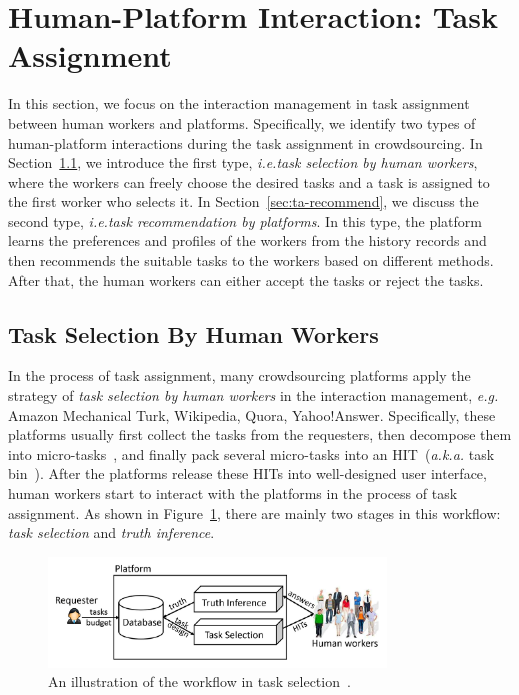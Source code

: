 \documentclass[11pt]{article}
\newcommand{\eg}{\textit{e.g.}\xspace}
\newcommand{\ie}{\textit{i.e.}\xspace}
\newcommand{\aka}{\textit{a.k.a.}\xspace}
\newcommand\figref[1]{Figure~\ref{#1}}
\newcommand\secref[1]{Section~\ref{#1}}
\begin{document}
\section{Human-Platform Interaction: Task Assignment} %
In this section, we focus on the interaction management in task assignment between human workers and platforms.
Specifically, we identify two types of human-platform interactions during the task assignment in crowdsourcing.
In \secref{sec:ta-selection}, we introduce the first type, \ie \textit{task selection by human workers},
where the workers can freely choose the desired tasks 
and a task is assigned to the first worker who selects it.
In \secref{sec:ta-recommend}, we discuss the second type,
\ie \textit{task recommendation by platforms}.
In this type, the platform learns the preferences and profiles of the workers from the history records
and then recommends the suitable tasks to the workers based on different methods.
After that, the human workers can either accept the tasks or reject the tasks.

\subsection{Task Selection By Human Workers}\label{sec:ta-selection}

In the process of task assignment,
many crowdsourcing platforms apply the strategy of \textit{task selection by human workers} in the interaction management,
\eg Amazon Mechanical Turk, Wikipedia, Quora, Yahoo!Answer.
Specifically, these platforms usually first collect the tasks from the requesters,
then decompose them into micro-tasks~\cite{DBLP:journals/tkde/TongCZJSL18},
and finally pack several micro-tasks into an HIT~(\aka task bin~\cite{DBLP:journals/tkde/TongCZJSL18}).
After the platforms release these HITs into well-designed user interface,
human workers start to interact with the platforms in the process of task assignment.
As shown in \figref{fig:ts-flow}, there are mainly two stages in this workflow: \textit{task selection} and \textit{truth inference}.

\begin{figure}
	\centering
	\includegraphics[width=0.8\textwidth]{figs/task-select.pdf}
	\caption{An illustration of the workflow in task selection~\cite{DBLP:journals/tkde/LiWZF16}.}
	\label{fig:ts-flow}
\end{figure}
\end{document}
